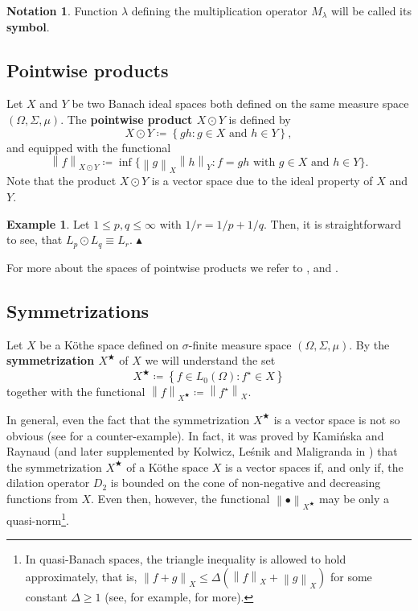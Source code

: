 \documentclass[11pt]{amsart}
\theoremstyle{definition}
\theoremstyle{definition}
\theoremstyle{definition}
\theoremstyle{definition}
\theoremstyle{definition}
\theoremstyle{definition}
\theoremstyle{definition}
\newtheorem{example}[theorem]{Example}
\theoremstyle{definition}
\numberwithin{equation}{section}
\numberwithin{equation}{section}
\numberwithin{equation}{section}
\theoremstyle{definition}
\theoremstyle{definition}
\newtheorem{notation}[theorem]{Notation}
\theoremstyle{definition}
\theoremstyle{definition}
\theoremstyle{definition}
\theoremstyle{definition}
\newcommand{\norm}[1]{\left\lVert#1\right\rVert}
\newcommand\xqed[1]{%
	\leavevmode\unskip\penalty9999 \hbox{}\nobreak\hfill
	\quad\hbox{#1}}
\newcommand\demo{\xqed{{\Large $\blacktriangle$}}}
\begin{document}
\begin{notation}
	Function $\lambda$ defining the multiplication operator $M_{\lambda}$ will be called its {\bf symbol}.
\end{notation}

\subsection{Pointwise products}

Let $X$ and $Y$ be two Banach ideal spaces both defined on the same measure space $(\Omega,\Sigma,\mu)$.
The {\bf pointwise product $X \odot Y$} is defined by
\begin{equation*}
	X \odot Y \coloneqq \left\{ gh \colon g \in X \text{ and } h \in Y \right\},
\end{equation*}
and equipped with the functional
\begin{equation*}
	\norm{f}_{X \odot Y} \coloneqq \inf \bigl\{ \norm{g}_X \norm{h}_Y \colon f = gh \text{ with } g \in X \text{ and } h \in Y \bigr\}.
\end{equation*}
Note that the product $X \odot Y$ is a vector space due to the ideal property of $X$ and $Y$.

\begin{example}
	Let $1 \leqslant p,q \leqslant \infty$ with $1/r = 1/p + 1/q$. Then, it is straightforward to see, that $L_p \odot L_q \equiv L_r$.
	\demo
\end{example}

For more about the spaces of pointwise products we refer to \cite{CS14}, \cite{KLM14} and \cite{Sch10}.

\subsection{Symmetrizations} \label{SUBSEC: Symmetrization}

Let $X$ be a K{\" o}the space defined on $\sigma$-finite measure space $(\Omega,\Sigma,\mu)$.
By the {\bf symmetrization $X^{\bigstar}$} of $X$ we will understand the set
\begin{equation*}
	X^{\bigstar} \coloneqq \left\{ f \in L_0(\Omega) \colon f^{\star} \in X \right\}
\end{equation*}
together with the functional $\norm{f}_{X^{\bigstar}} \coloneqq \norm{f^{\star}}_X$.

In general, even the fact that the symmetrization $X^{\bigstar}$ is a vector space is not so obvious
(see \cite[Example~3.1]{CKMP04} for a counter-example). In fact, it was proved by Kami{\' n}ska and Raynaud \cite[Lemma~1.4]{KR09}
(and later supplemented by Kolwicz, Le{\' s}nik and Maligranda in \cite[Corollary~1]{KLM19}) that the symmetrization $X^{\bigstar}$ of
a K{\" o}the space $X$ is a vector spaces if, and only if, the dilation operator $D_2$ is bounded on the cone of non-negative and
decreasing functions from $X$. Even then, however, the functional $\norm{\bullet}_{X^{\bigstar}}$ may be only a quasi-norm\footnote{In quasi-Banach
spaces, the triangle inequality is allowed to hold approximately, that is, $\norm{f + g}_X \leqslant \Delta \left( \norm{f}_X + \norm{g}_X \right)$
for some constant $\Delta \geqslant 1$ (see, for example, \cite{Kal03} for more).}.
\end{document}
